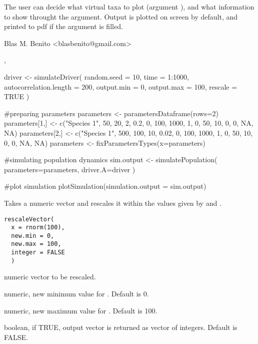 \documentclass[letterpaper]{book}
\begin{document}
%
\begin{Details}\relax
The user can decide what virtual taxa to plot (argument ), and what information to show throught the  argument. Output is plotted on screen by default, and printed to pdf if the  argument is filled.
\end{Details}
%
\begin{Author}\relax
Blas M. Benito  <blasbenito@gmail.com>
\end{Author}
%
\begin{SeeAlso}\relax
{}, 
\end{SeeAlso}
%
\begin{Examples}
\begin{ExampleCode}

driver <- simulateDriver(
 random.seed = 10,
 time = 1:1000,
 autocorrelation.length = 200,
 output.min = 0,
 output.max = 100,
 rescale = TRUE
 )

#preparing parameters
parameters <- parametersDataframe(rows=2)
parameters[1,] <- c("Species 1", 50, 20, 2, 0.2, 0, 100, 1000, 1, 0, 50, 10, 0, 0, NA, NA)
parameters[2,] <- c("Species 1", 500, 100, 10, 0.02, 0, 100, 1000, 1, 0, 50, 10, 0, 0, NA, NA)
parameters <- fixParametersTypes(x=parameters)

#simulating population dynamics
sim.output <- simulatePopulation(
 parameters=parameters,
 driver.A=driver
 )

#plot simulation
plotSimulation(simulation.output = sim.output)

\end{ExampleCode}
\end{Examples}
%
\begin{Description}\relax
Takes a numeric vector  and rescales it within the values given by  and .
\end{Description}
%
\begin{Usage}
\begin{verbatim}
rescaleVector(
  x = rnorm(100),
  new.min = 0,
  new.max = 100,
  integer = FALSE
  )
\end{verbatim}
\end{Usage}
%
\begin{Arguments}
\begin{ldescription}
\item[\code{x}] numeric vector to be rescaled.

\item[\code{new.min}] numeric, new minimum value for . Default is 0.

\item[\code{new.max}] numeric, new maximum value for . Default is 100.

\item[\code{integer}] boolean, if TRUE, output vector is returned as vector of integers. Default is FALSE.
\end{ldescription}
\end{Arguments}
\end{document}
